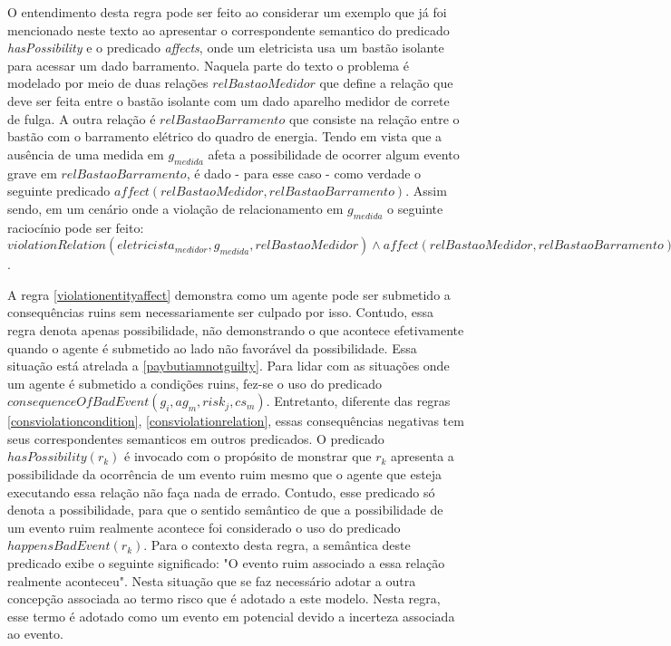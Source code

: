 O entendimento desta regra pode ser feito ao considerar um exemplo que já foi mencionado neste texto ao apresentar o correspondente semantico do predicado 
\textit{hasPossibility} e o predicado \textit{affects}, onde um eletricista usa um bastão isolante para acessar um dado barramento. Naquela parte do texto 
o problema é modelado por meio de duas relações $relBastaoMedidor$ que define a relação que deve ser feita entre o bastão isolante com um dado aparelho 
medidor de correte de fulga. A outra relação é $relBastaoBarramento$ que consiste na relação entre o bastão com o barramento elétrico do quadro de energia. 
Tendo em vista que a ausência de uma medida em $g_{medida}$ afeta a possibilidade de ocorrer algum evento grave em $relBastaoBarramento$, 
é dado - para esse caso - como verdade o seguinte predicado $affect(relBastaoMedidor, relBastaoBarramento)$. Assim sendo, em um cenário onde a violação 
de relacionamento em $g_{medida}$ o seguinte raciocínio pode ser feito: 
$violationRelation(eletricista_{medidor},g_{medida},relBastaoMedidor) \wedge affect(relBastaoMedidor, relBastaoBarramento) \to hasPossibility(relBastaoBarramento)$.   

A regra \ref{violationentityaffect} demonstra como um agente pode ser submetido a consequências ruins sem necessariamente ser culpado por isso. Contudo, 
essa regra denota apenas possibilidade, não demonstrando o que acontece efetivamente quando o agente é submetido ao lado não favorável da possibilidade.
Essa situação está atrelada a \ref{paybutiamnotguilty}. Para lidar com as situações onde um agente é submetido a condições ruins, fez-se o uso do 
predicado $consequenceOfBadEvent(g_i,ag_m,risk_j,cs_m) $. Entretanto, diferente das regras \ref{consviolationcondition}, \ref{consviolationrelation}, 
essas consequências negativas tem seus correspondentes semanticos em outros predicados. O predicado $hasPossibility(r_k)$ é invocado com o propósito 
de monstrar que $r_k$ apresenta a possibilidade da ocorrência de um evento ruim mesmo que o agente que esteja executando essa relação não faça nada de errado. 
Contudo, esse predicado só denota a possibilidade, para que o sentido semântico de que a possibilidade de um evento ruim realmente acontece foi considerado 
o uso do predicado $happensBadEvent(r_k)$. Para o contexto desta regra, a semântica deste predicado exibe o seguinte significado: "O evento ruim associado 
a essa relação realmente aconteceu". Nesta situação que se faz necessário adotar a outra concepção associada ao termo risco que é adotado a este modelo.
Nesta regra, esse termo é adotado como um evento em potencial devido a incerteza associada ao evento. 

